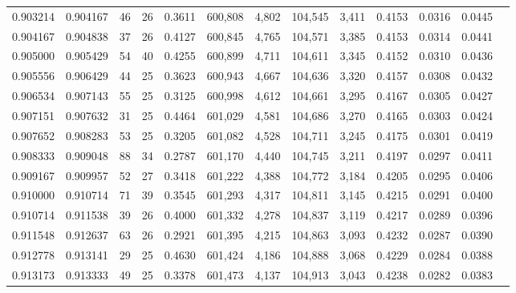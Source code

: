 \begin{tabular}{rrrrrrrrrrrrr}
0.903214 & 0.904167 &     46 &    26 &                                     0.3611 & 600,808 &   4,802 & 104,545 &   3,411 & 0.4153 & 0.0316 & 0.0445 \\
0.904167 & 0.904838 &     37 &    26 &                                     0.4127 & 600,845 &   4,765 & 104,571 &   3,385 & 0.4153 & 0.0314 & 0.0441 \\
0.905000 & 0.905429 &     54 &    40 &                                     0.4255 & 600,899 &   4,711 & 104,611 &   3,345 & 0.4152 & 0.0310 & 0.0436 \\
0.905556 & 0.906429 &     44 &    25 &                                     0.3623 & 600,943 &   4,667 & 104,636 &   3,320 & 0.4157 & 0.0308 & 0.0432 \\
0.906534 & 0.907143 &     55 &    25 &                                     0.3125 & 600,998 &   4,612 & 104,661 &   3,295 & 0.4167 & 0.0305 & 0.0427 \\
0.907151 & 0.907632 &     31 &    25 &                                     0.4464 & 601,029 &   4,581 & 104,686 &   3,270 & 0.4165 & 0.0303 & 0.0424 \\
0.907652 & 0.908283 &     53 &    25 &                                     0.3205 & 601,082 &   4,528 & 104,711 &   3,245 & 0.4175 & 0.0301 & 0.0419 \\
0.908333 & 0.909048 &     88 &    34 &                                     0.2787 & 601,170 &   4,440 & 104,745 &   3,211 & 0.4197 & 0.0297 & 0.0411 \\
0.909167 & 0.909957 &     52 &    27 &                                     0.3418 & 601,222 &   4,388 & 104,772 &   3,184 & 0.4205 & 0.0295 & 0.0406 \\
0.910000 & 0.910714 &     71 &    39 &                                     0.3545 & 601,293 &   4,317 & 104,811 &   3,145 & 0.4215 & 0.0291 & 0.0400 \\
0.910714 & 0.911538 &     39 &    26 &                                     0.4000 & 601,332 &   4,278 & 104,837 &   3,119 & 0.4217 & 0.0289 & 0.0396 \\
0.911548 & 0.912637 &     63 &    26 &                                     0.2921 & 601,395 &   4,215 & 104,863 &   3,093 & 0.4232 & 0.0287 & 0.0390 \\
0.912778 & 0.913141 &     29 &    25 &                                     0.4630 & 601,424 &   4,186 & 104,888 &   3,068 & 0.4229 & 0.0284 & 0.0388 \\
0.913173 & 0.913333 &     49 &    25 &                                     0.3378 & 601,473 &   4,137 & 104,913 &   3,043 & 0.4238 & 0.0282 & 0.0383 \\

\end{tabular}
